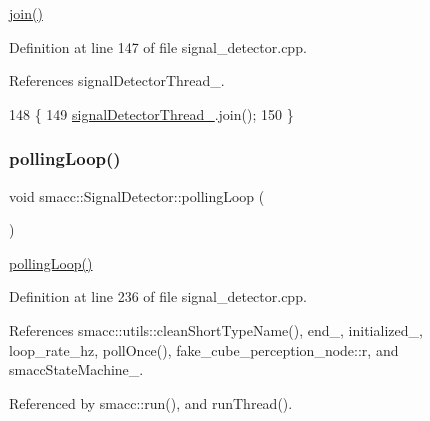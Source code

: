 \hyperlink{classsmacc_1_1SignalDetector_a636f704e469bf74b4a9fdb15bd63d5be}{join()} 

Definition at line 147 of file signal\+\_\+detector.\+cpp.



References signal\+Detector\+Thread\+\_\+.


\begin{DoxyCode}
148     \{
149         \hyperlink{classsmacc_1_1SignalDetector_a4346a400cd37eafc5d1d2e63d975785e}{signalDetectorThread\_}.join();
150     \}
\end{DoxyCode}
\mbox{\label{classsmacc_1_1SignalDetector_a2665e66cdae9f6533c64bbcecf3fa199}} 
\subsubsection{\texorpdfstring{polling\+Loop()}{pollingLoop()}}
{\footnotesize\ttfamily void smacc\+::\+Signal\+Detector\+::polling\+Loop (\begin{DoxyParamCaption}{ }\end{DoxyParamCaption})}

\hyperlink{classsmacc_1_1SignalDetector_a2665e66cdae9f6533c64bbcecf3fa199}{polling\+Loop()} 

Definition at line 236 of file signal\+\_\+detector.\+cpp.



References smacc\+::utils\+::clean\+Short\+Type\+Name(), end\+\_\+, initialized\+\_\+, loop\+\_\+rate\+\_\+hz, poll\+Once(), fake\+\_\+cube\+\_\+perception\+\_\+node\+::r, and smacc\+State\+Machine\+\_\+.



Referenced by smacc\+::run(), and run\+Thread().


